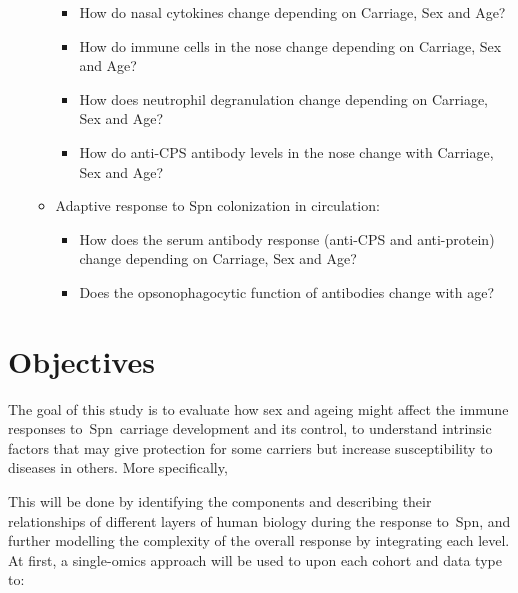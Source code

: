 \documentclass[
]{book}
\begin{document}
\begin{itemize}
\begin{itemize}
    \begin{itemize}
    \item
      How do nasal cytokines change depending on Carriage, Sex and Age?
    \item
      How do immune cells in the nose change depending on Carriage, Sex and Age?
    \item
      How does neutrophil degranulation change depending on Carriage, Sex and Age?
    \item
      How do anti-CPS antibody levels in the nose change with Carriage, Sex and Age?
    \end{itemize}
  \item
    Adaptive response to Spn colonization in circulation:

    \begin{itemize}
    \item
      How does the serum antibody response (anti-CPS and anti-protein) change depending on Carriage, Sex and Age?
    \item
      Does the opsonophagocytic function of antibodies change with age?
    \end{itemize}
  \end{itemize}
\end{itemize}

\hypertarget{objectives}{%
\section{Objectives}\label{objectives}}

The goal of this study is to evaluate how sex and ageing might affect the immune responses to~Spn~carriage development and its control, to understand intrinsic factors that may give protection for some carriers but increase susceptibility to diseases in others. More specifically,

This will be done by identifying the components and describing their relationships of different layers of human biology during the response to~Spn, and further modelling the complexity of the overall response by integrating each level. At first, a single-omics approach will be used to upon each cohort and data type to:
\end{document}
